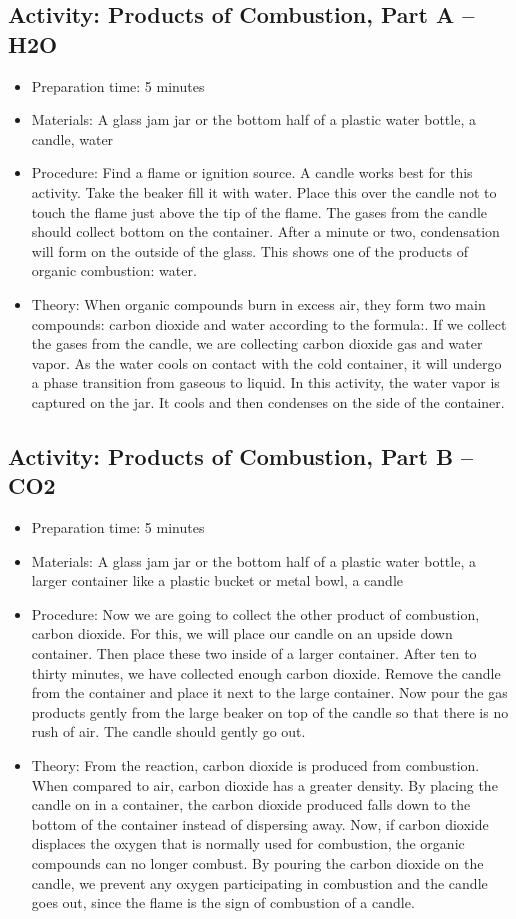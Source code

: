 \begin{itemize}
{\subsection{Activity: Products of Combustion, Part A – H2O}
\begin{itemize}
\item{Preparation time: 5 minutes}
\item{Materials: A glass jam jar or the bottom half of a plastic water bottle, a candle, water}
\item{Procedure: Find a flame or ignition source. A candle works best for this activity. Take the beaker fill it with water. Place this over the candle not to touch the flame just above the tip of the flame. The gases from the candle should collect bottom on the container. After a minute or two, condensation will form on the outside of the glass. This shows one of the products of organic combustion: water.}
\item{Theory: When organic compounds burn in excess air, they form two main compounds: carbon dioxide and water according to the formula:. If we collect the gases from the candle, we are collecting carbon dioxide gas and water vapor. As the water cools on contact with the cold container, it will undergo a phase transition from gaseous to liquid. In this activity, the water vapor is captured on the jar. It cools and then condenses on the side of the container.}
\end{itemize}

\subsection{Activity: Products of Combustion, Part B – CO2}
\begin{itemize}
\item{Preparation time: 5 minutes}
\item{Materials: A glass jam jar or the bottom half of a plastic water bottle, a larger container like a plastic bucket or metal bowl, a candle}
\item{Procedure: Now we are going to collect the other product of combustion, carbon dioxide. For this, we will place our candle on an upside down container. Then place these two inside of a larger container. After ten to thirty minutes, we have collected enough carbon dioxide. Remove the candle from the container and place it next to the large container. Now pour the gas products gently from the large beaker on top of the candle so that there is no rush of air. The candle should gently go out.}
\item{Theory: From the reaction, carbon dioxide is produced from combustion. When compared to air, carbon dioxide has a greater density. By placing the candle on in a container, the carbon dioxide produced falls down to the bottom of the container instead of dispersing away. Now, if carbon dioxide displaces the oxygen that is normally used for combustion, the organic compounds can no longer combust. By pouring the carbon dioxide on the candle, we prevent any oxygen participating in combustion and the candle goes out, since the flame is the sign of combustion of a candle.}
\end{itemize}

}
\end{itemize}
